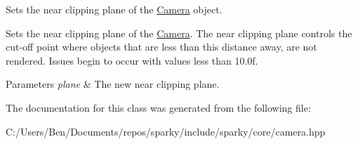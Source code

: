 Sets the near clipping plane of the \hyperlink{classsparky_1_1_camera}{Camera} object. 

Sets the near clipping plane of the \hyperlink{classsparky_1_1_camera}{Camera}. The near clipping plane controls the cut-\/off point where objects that are less than this distance away, are not rendered. Issues begin to occur with values less than 10.\+0f.


\begin{DoxyParams}{Parameters}
{\em plane} & The new near clipping plane. \\
\hline
\end{DoxyParams}


The documentation for this class was generated from the following file\+:\begin{DoxyCompactItemize}
\item 
C\+:/\+Users/\+Ben/\+Documents/repos/sparky/include/sparky/core/camera.\+hpp\end{DoxyCompactItemize}

